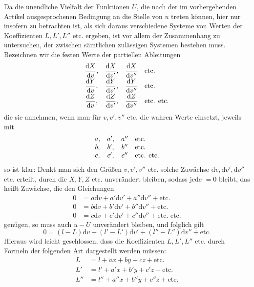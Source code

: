 Da die unendliche Vielfalt der Funktionen \(U\), die nach der im vorhergehenden Artikel ausgesprochenen Bedingung an die Stelle von \(u\) treten können, hier nur insofern zu betrachten ist, als sich daraus verschiedene Systeme von Werten der Koeffizienten \(L,L',L''\) etc. ergeben, ist vor allem der Zusammenhang zu untersuchen, der zwischen sämtlichen zulässigen Systemen bestehen muss. Bezeichnen wir die festen Werte der partiellen Ableitungen
\begingroup\renewcommand{\arraystretch}{2}
\[
\begin{array}{ccc l}
\dfrac{\mathrm dX}{\mathrm dv},&\dfrac{\mathrm dX}{\mathrm dv'},&\dfrac{\mathrm dX}{\mathrm dv''}&\text{etc.}\\[5pt]
\dfrac{\mathrm dY}{\mathrm dv},&\dfrac{\mathrm dY}{\mathrm dv'},&\dfrac{\mathrm dY}{\mathrm dv''}&\text{etc.}\\[5pt]
\dfrac{\mathrm dZ}{\mathrm dv},&\dfrac{\mathrm dZ}{\mathrm dv'},&\dfrac{\mathrm dZ}{\mathrm dv''}&\text{etc. etc.}
\end{array}
\]
\endgroup
die sie annehmen, wenn man für \(v,v',v''\) etc. die wahren Werte einsetzt, jeweils mit
\[
\begin{array}{ccc l}
a,&a',&a''&\text{etc.}\\
b,&b',&b''&\text{etc.}\\
c,&c',&c''&\text{etc. etc.}
\end{array}
\]
so ist klar: Denkt man sich den Größen \(v,v',v''\) etc. solche Zuwächse \(\mathrm dv,\mathrm dv',\mathrm dv''\) etc. erteilt, durch die \(X,Y,Z\) etc. unverändert bleiben, sodass jede \(=0\) bleibt, das heißt Zuwächse, die den Gleichungen
\[
\begin{aligned}
0&=a\mathrm dv+a'\mathrm dv'+a''\mathrm dv''+\text{etc.}\\
0&=b\mathrm dv+b'\mathrm dv'+b''\mathrm dv''+\text{etc.}\\
0&=c\mathrm dv+c'\mathrm dv'+c''\mathrm dv''+\text{etc. etc.}
\end{aligned}
\]
genügen, so muss auch \(u-U\) unverändert bleiben, und folglich gilt
\[
0=(l-L)\mathrm dv+(l'-L')\mathrm dv'+(l''-L'')\mathrm dv''+\text{etc.}
\]
%
Hieraus wird leicht geschlossen, dass die Koeffizienten \(L,L',L''\) etc. durch Formeln der folgenden Art dargestellt werden müssen:
\[
\begin{aligned}
L&=l+ax+by+cz+\text{etc.}\\
L'&=l'+a'x+b'y+c'z+\text{etc.}\\
L''&=l''+a''x+b''y+c''z+\text{etc.}
\end{aligned}
\]
